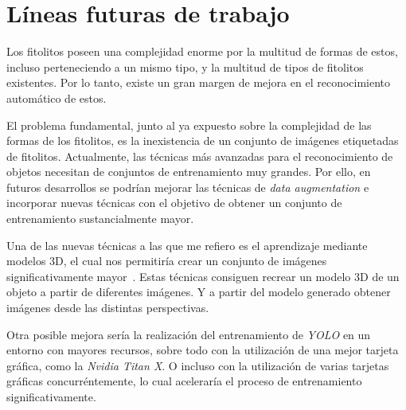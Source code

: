 \section{Líneas futuras de trabajo}

Los fitolitos poseen una complejidad enorme por la multitud de formas de estos, incluso perteneciendo a un mismo tipo, y la multitud de tipos de fitolitos existentes. Por lo tanto, existe un gran margen de mejora en el reconocimiento automático de estos.

El problema fundamental, junto al ya expuesto sobre la complejidad de las formas de los fitolitos, es la inexistencia de un conjunto de imágenes etiquetadas de fitolitos. Actualmente, las técnicas más avanzadas para el reconocimiento de objetos necesitan de conjuntos de entrenamiento muy grandes. Por ello, en futuros desarrollos se podrían mejorar las técnicas de \textit{data augmentation} e incorporar nuevas técnicas con el objetivo de obtener un conjunto de entrenamiento sustancialmente mayor.

Una de las nuevas técnicas a las que me refiero es el aprendizaje mediante modelos 3D, el cual nos permitiría crear un conjunto de imágenes significativamente mayor~\cite{sem,3dmodels}. Estas técnicas consiguen recrear un modelo 3D de un objeto a partir de diferentes imágenes. Y a partir del modelo generado obtener imágenes desde las distintas perspectivas.

Otra posible mejora sería la realización del entrenamiento de \textit{YOLO} en un entorno con mayores recursos, sobre todo con la utilización de una mejor tarjeta gráfica, como la \textit{Nvidia Titan X}. O incluso con la utilización de varias tarjetas gráficas concurréntemente, lo cual aceleraría el proceso de entrenamiento significativamente.